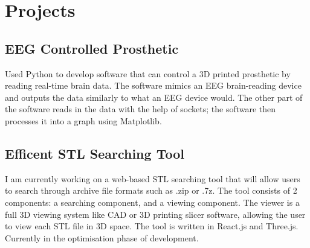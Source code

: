 \documentclass{article}
\begin{document}
\noindent
\begin{minipage}[t]{1\textwidth}
    \section{Projects}
    \subsection{EEG Controlled Prosthetic}
    \vspace{-0.5em} %
    \normalsize{Used Python to develop software that can control a 3D printed
    prosthetic by reading real-time brain data. The software mimics
    an EEG brain-reading device and outputs the data similarly to
    what an EEG device would. The other part of the software reads
    in the data with the help of sockets; the software then processes
    it into a graph using Matplotlib.}
    \vspace{0.5em} %
\begin{comment}
    \subsection{Efficient Sudoku Solver}
    \vspace{-0.5em} %
    \normalsize{Used C++ to implement an algorithm to solve given Sudoku puzzles as efficiently as possible using the hidden single and naked
    single algorithm with the help of pointers to make it more efficient.}
    \vspace{0.5em} %
\end{comment}

    \subsection{Efficent STL Searching Tool}
    \vspace{-0.5em} %
    \normalsize{I am currently working on a web-based STL searching tool that will allow users to search through archive file formats such as .zip or .7z. The tool consists of 2 components: a searching component, and a viewing component. The viewer is a full 3D viewing system like CAD or 3D printing slicer software, allowing the user to view each STL file in 3D space. The tool is written in React.js and Three.js. Currently in the optimisation phase of development.}
    \vspace{0.5em} %
\end{minipage}
\end{document}
